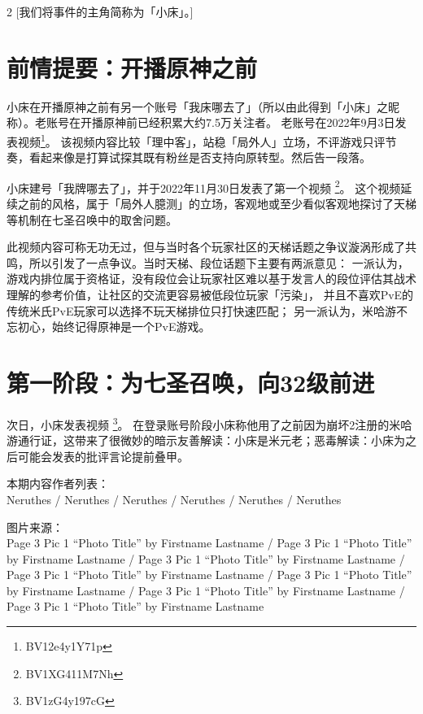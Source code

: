 

\begin{multicols*}{2}
	[\noindent 我们将事件的主角简称为「小床」。]

	\section*{前情提要：开播原神之前}
	小床在开播原神之前有另一个账号「我床哪去了」（所以由此得到「小床」之昵称）。老账号在开播原神前已经积累大约7.5万关注者。
    老账号在2022年9月3日发表视频\href{https://www.bilibili.com/video/BV12e4y1Y71p}{}\hfill\footnote{BV12e4y1Y71p}\hfill。
    该视频内容比较「理中客」，站稳「局外人」立场，不评游戏只评节奏，看起来像是打算试探其既有粉丝是否支持向原转型。然后告一段落。

    小床建号「我牌哪去了」，并于2022年11月30日发表了第一个视频%
    \href{https://www.bilibili.com/video/BV1XG411M7Nh}{}\hfill\footnote{BV1XG411M7Nh}\hfill。
    这个视频延续之前的风格，属于「局外人臆测」的立场，客观地或至少看似客观地探讨了天梯等机制在七圣召唤中的取舍问题。
    
    此视频内容可称无功无过，但与当时各个玩家社区的天梯话题之争议漩涡形成了共鸣，所以引发了一点争议。当时天梯、段位话题下主要有两派意见：
    一派认为，游戏内排位属于资格证，没有段位会让玩家社区难以基于发言人的段位评估其战术理解的参考价值，让社区的交流更容易被低段位玩家「污染」，
    并且不喜欢PvE的传统米氏PvE玩家可以选择不玩天梯排位只打快速匹配；
    另一派认为，米哈游不忘初心，始终记得原神是一个PvE游戏。

    \section*{第一阶段：为七圣召唤，向32级前进}
    次日，小床发表视频%
    \href{https://www.bilibili.com/video/BV1zG4y197cG}{}\CJKecglue\footnote{BV1zG4y197cG}\CJKecglue。
    在登录账号阶段小床称他用了之前因为崩坏2注册的米哈游通行证，这带来了很微妙的暗示\pozhehao{}友善解读：小床是米元老；恶毒解读：小床为之后可能会发表的批评言论提前叠甲。
    
\end{multicols*}












本期内容作者列表：\\
Neruthes /
Neruthes /
Neruthes /
Neruthes /
Neruthes /
Neruthes

\vskip 10pt

图片来源：\\
Page 3 Pic 1 ``Photo Title'' by Firstname Lastname /
Page 3 Pic 1 ``Photo Title'' by Firstname Lastname /
Page 3 Pic 1 ``Photo Title'' by Firstname Lastname /
Page 3 Pic 1 ``Photo Title'' by Firstname Lastname /
Page 3 Pic 1 ``Photo Title'' by Firstname Lastname /
Page 3 Pic 1 ``Photo Title'' by Firstname Lastname /
Page 3 Pic 1 ``Photo Title'' by Firstname Lastname


